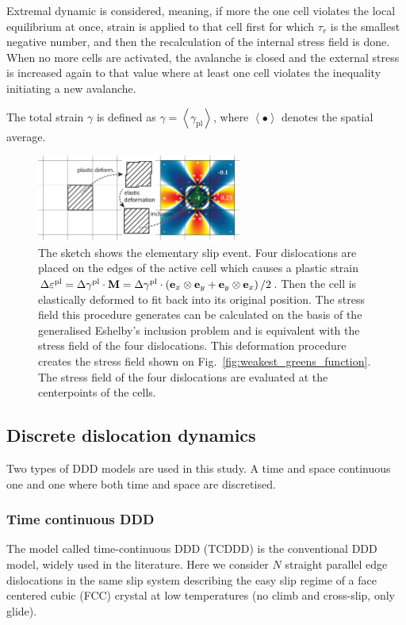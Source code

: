 Extremal dynamic is considered, meaning, if more the one cell violates the local equilibrium at once, strain is applied to that cell first for which ${\tau _r}$ is the smallest negative number, and then the recalculation of the internal stress field is done. When no more cells are activated, the avalanche is closed and the external stress is increased again to that value where at least one cell violates the inequality initiating a new avalanche.

The total strain $\gamma$ is defined as $\gamma  = \left\langle {{\gamma _{{\text{pl}}}}} \right\rangle $, where $\left\langle  \bullet  \right\rangle $ denotes the spatial average.

\begin{figure}[htbp!] 
\centering    
\includegraphics[width=0.6\textwidth]{arrangement}
\caption[Sketch of elementary slip event]{The sketch shows the elementary slip event. Four dislocations are placed on the edges of the active cell which causes a plastic strain $\Delta {\varepsilon ^{{\rm{pl}}}} = \Delta {\gamma ^{{\rm{pl}}}} \cdot {\bf{M}} = \Delta {\gamma ^{{\rm{pl}}}} \cdot \left( {{{\bf{e}}_x} \otimes {{\bf{e}}_y} + {{\bf{e}}_y} \otimes {{\bf{e}}_x}} \right)/2$. Then the cell is elastically deformed to fit back into its original position. The stress field this procedure generates can be calculated on the basis of the generalised Eshelby's inclusion problem and is equivalent with the stress field of the four dislocations. This deformation procedure creates the stress field shown on Fig.~\ref{fig:weakest_greens_function}. The stress field of the four dislocations are evaluated at the centerpoints of the cells.}
\label{fig:weakest_elementary_slip_event}
\end{figure}


\subsection{Discrete dislocation dynamics}
Two types of DDD models are used in this study. A time and space continuous one and one where both time and space are discretised.

\subsubsection{Time continuous DDD}
The model called time-continuous DDD (TCDDD) is the conventional DDD model, widely used in the literature. Here we consider $N$ straight parallel edge dislocations in the same slip system describing the easy slip regime of a face centered cubic (FCC)  crystal at low temperatures (no climb and cross-slip, only glide).

